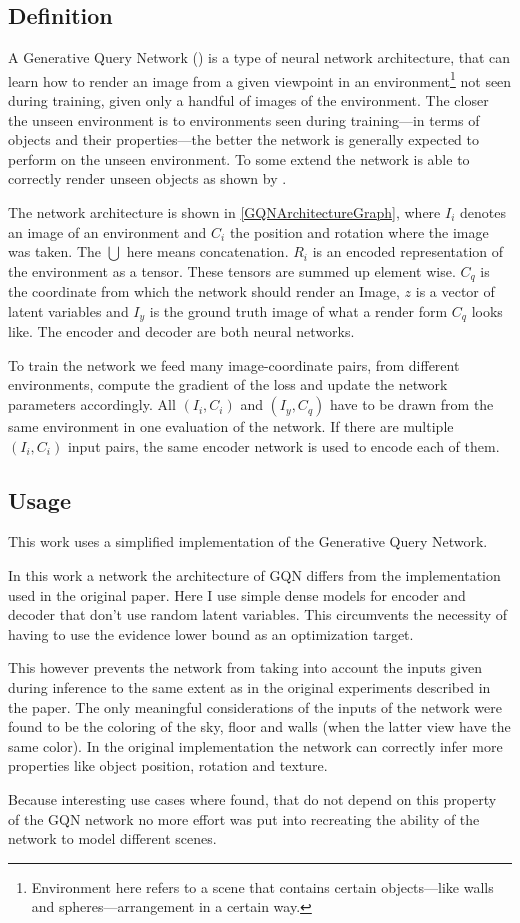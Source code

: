 \subsection{Definition}
A Generative Query Network (\cite{gqn}) is a type of neural network architecture, that can learn how to render an image from a given viewpoint in an environment\footnote{Environment here refers to a scene that contains certain objects---like walls and spheres---arrangement in a certain way.} not seen during training, given only a handful of images of the environment. The closer the unseen environment is to environments seen during training---in terms of objects and their properties---the better the network is generally expected to perform on the unseen environment. To some extend the network is able to correctly render unseen objects as shown by \cite{gqn}.

The network architecture is shown in \cref{GQNArchitectureGraph}, where $I_i$ denotes an image of an environment and $C_i$ the position and rotation where the image was taken. The $\bigcup$ here means concatenation. $R_i$ is an encoded representation of the environment as a tensor. These tensors are summed up element wise. $C_q$ is the coordinate from which the network should render an Image, $z$ is a vector of latent variables and $I_y$ is the ground truth image of what a render form $C_q$ looks like. The encoder and decoder are both neural networks.

To train the network we feed many image-coordinate pairs, from different environments, compute the gradient of the loss and update the network parameters accordingly. All $(I_i, C_i)$ and $(I_y, C_q)$ have to be drawn from the same environment in one evaluation of the network. If there are multiple $(I_i, C_i)$ input pairs, the same encoder network is used to encode each of them.

\GQNArchitectureGraph


\subsection{Usage}
This work uses a simplified implementation of the Generative Query Network.

In this work a network the architecture of GQN differs from the implementation used in the original paper. Here I use simple dense models for encoder and decoder that don't use random latent variables. This circumvents the necessity of having to use the evidence lower bound as an optimization target.

This however prevents the network from taking into account the inputs given during inference to the same extent as in the original experiments described in the paper. The only meaningful considerations of the inputs of the network were found to be the coloring of the sky, floor and walls (when the latter view have the same color). In the original implementation the network can correctly infer more properties like object position, rotation and texture.

Because interesting use cases where found, that do not depend on this property of the GQN network no more effort was put into recreating the ability of the network to model different scenes.
